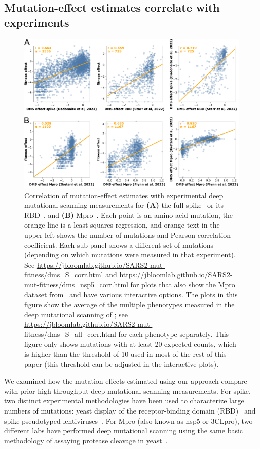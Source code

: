 \documentclass[9pt,twocolumn,twoside]{gsajnl_modified}
\begin{document}
\subsection*{Mutation-effect estimates correlate with experiments}

\begin{figure}
\centering
\includegraphics[width=0.7\linewidth]{figs/dms.png}
\caption{
Correlation of mutation-effect estimates with experimental deep mutational scanning measurements for {\bf (A)} the full spike~\citep{dadonaite2023pseudovirus} or its RBD~\citep{starr2022deep}, and {\bf (B)} Mpro~\citep{flynn2023,iketani2022functional}.
Each point is an amino-acid mutation, the orange line is a least-squares regression, and orange text in the upper left shows the number of mutations and Pearson correlation coefficient.
Each sub-panel shows a different set of mutations (depending on which mutations were measured in that experiment).
See \url{https://jbloomlab.github.io/SARS2-mut-fitness/dms_S_corr.html} and \url{https://jbloomlab.github.io/SARS2-mut-fitness/dms_nsp5_corr.html} for plots that also show the Mpro dataset from~\citep{flynn2022} and have various interactive options.
The plots in this figure show the average of the multiple phenotypes measured in the deep mutational scanning of \cite{starr2022deep}; see \url{https://jbloomlab.github.io/SARS2-mut-fitness/dms_S_all_corr.html} for each phenotype separately.
This figure only shows mutations with at least 20 expected counts, which is higher than the threshold of 10 used in most of the rest of this paper (this threshold can be adjusted in the interactive plots).
\label{fig:dms}
}
\end{figure}

We examined how the mutation effects estimated using our approach compare with prior high-throughput deep mutational scanning measurements.
For spike, two distinct experimental methodologies have been used to characterize large numbers of mutations: yeast display of the receptor-binding domain (RBD)~\citep{starr2020deep,starr2022deep} and spike pseudotyped lentiviruses~\citep{dadonaite2023pseudovirus}.
For Mpro (also known as nsp5 or 3CLpro), two different labs have performed deep mutational scanning using the same basic methodology of assaying protease cleavage in yeast~\citep{flynn2022,flynn2023,iketani2022functional}.
\end{document}
